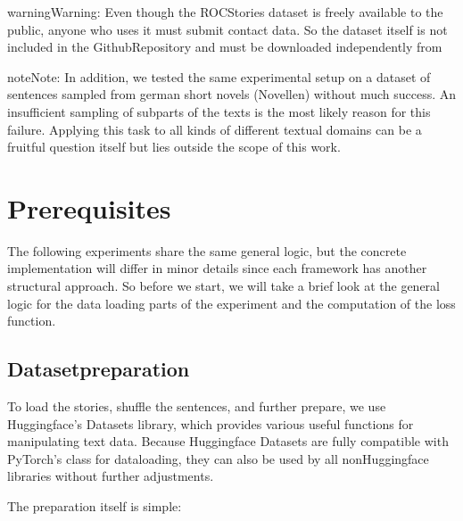 \documentclass[letterpaper,10pt,english]{jupyterBook}
\begin{document}
\begin{sphinxadmonition}{warning}{Warning:}
\sphinxAtStartPar
Even though the ROCStories dataset is freely available to the public, anyone who uses it must submit contact data. So the dataset itself is not included in the Github\sphinxhyphen{}Repository and must be downloaded independently from 
\end{sphinxadmonition}

\begin{sphinxadmonition}{note}{Note:}
\sphinxAtStartPar
In addition, we tested the same experimental setup on a dataset of sentences sampled from german short novels (Novellen) without much success. An insufficient sampling of subparts of the texts is the most likely reason for this failure.
Applying this task to all kinds of different textual domains can be a fruitful question itself but lies outside the scope of this work.
\end{sphinxadmonition}


\chapter{Prerequisites}
\label{\detokenize{Prerequisites:prerequisites}}\label{\detokenize{Prerequisites::doc}}
\sphinxAtStartPar
The following experiments share the same general logic, but the concrete implementation will differ in minor details since each framework has another structural approach.
So before we start, we will take a brief look at the general logic for the data loading parts of the experiment and the computation of the loss function.


\section{Dataset\sphinxhyphen{}preparation}
\label{\detokenize{Prerequisites:dataset-preparation}}
\sphinxAtStartPar
To load the stories, shuffle the sentences, and further prepare, we use Huggingface’s Datasets library, which provides various useful functions for manipulating text data.
Because Huggingface Datasets are fully compatible with PyTorch’s class for data\sphinxhyphen{}loading, they can also be used by all non\sphinxhyphen{}Huggingface libraries without further adjustments.

\sphinxAtStartPar
The preparation itself is simple:
\begin{sphinxVerbatimInput}

\begin{sphinxVerbatim}[commandchars=\\\{\}]
    
\end{sphinxVerbatim}
\end{sphinxVerbatimInput}
\end{document}

